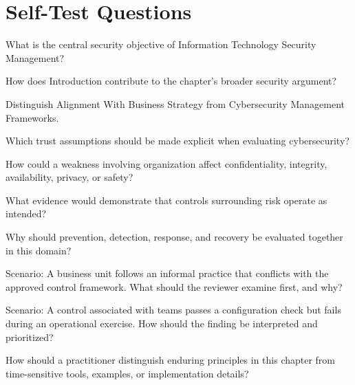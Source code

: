 \documentclass[11pt,letterpaper]{article}
\begin{document}
\section*{Self-Test Questions}
\begin{CornellRecallList}
\item What is the central security objective of Information Technology Security Management?
\item How does Introduction contribute to the chapter's broader security argument?
\item Distinguish Alignment With Business Strategy from Cybersecurity Management Frameworks.
\item Which trust assumptions should be made explicit when evaluating cybersecurity?
\item How could a weakness involving organization affect confidentiality, integrity, availability, privacy, or safety?
\item What evidence would demonstrate that controls surrounding risk operate as intended?
\item Why should prevention, detection, response, and recovery be evaluated together in this domain?
\item Scenario: A business unit follows an informal practice that conflicts with the approved control framework. What should the reviewer examine first, and why?
\item Scenario: A control associated with teams passes a configuration check but fails during an operational exercise. How should the finding be interpreted and prioritized?
\item How should a practitioner distinguish enduring principles in this chapter from time-sensitive tools, examples, or implementation details?
\end{CornellRecallList}
\end{document}
